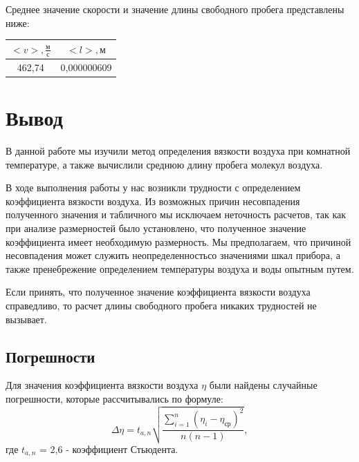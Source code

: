\documentclass[a4paper,12pt]{article}
\begin{document}
\vspace{\parindent}Среднее значение скорости и значение длины свободного пробега представлены ниже:
\begin{center}
	\begin{tabular}{|c|c|}
		\hline
		$<v>, \frac{м}{с}$&$<l>, м$\\
		\hline
		462,74&0,000000609\\
		\hline
	\end{tabular}
\end{center}

\newpage
\section{Вывод}
\hspace{\parindent}В данной работе мы изучили метод определения вязкости воздуха при комнатной температуре, а также вычислили среднюю длину пробега молекул воздуха.

В ходе выполнения работы у нас возникли трудности с определением коэффициента вязкости воздуха. Из возможных причин несовпадения полученного значения и табличного мы исключаем неточность расчетов, так как при анализе размерностей было установлено, что полученное значение коэффициента имеет необходимую размерность.
Мы предполагаем, что причиной несовпадения может служить неопределенность\hspace{0.2cm}со значениями шкал прибора, а также пренебрежение определением температуры воздуха и воды опытным путем.

Если принять, что полученное значение коэффициента вязкости воздуха справедливо, то расчет длины свободного пробега никаких трудностей не вызывает.

\subsection{Погрешности}
Для значения коэффициента вязкости воздуха $\eta$ были найдены случайные погрешности, которые рассчитывались по формуле:
$$\Delta\eta = t_{a,n}\sqrt{\frac{\sum_{i=1}^{n}(\eta_i-\eta_{ср})^2}{n(n-1)}},$$
где $t_{a,n}$ = 2,6 - коэффициент Стьюдента. 


	
\end{document}
